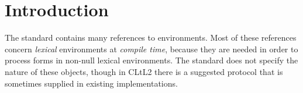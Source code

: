 \section{Introduction}

The \commonlisp{} standard contains many references to environments.
Most of these references concern \emph{lexical} environments at
\emph{compile time}, because they are needed in order to process forms
in non-null lexical environments.  The standard does not specify the
nature of these objects, though in CLtL2 \cite{Steele:1990:CLL:95411}
there is a suggested protocol that is sometimes supplied in existing
\commonlisp{} implementations. 

